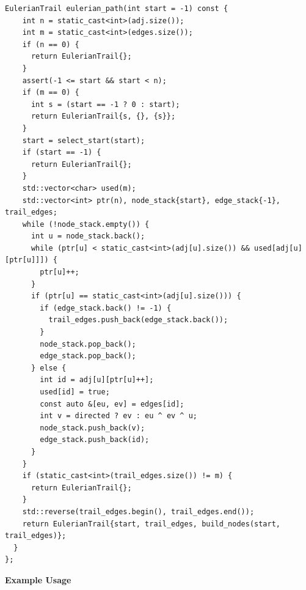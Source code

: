 \begin{lstlisting}[style=cpp]
  EulerianTrail eulerian_path(int start = -1) const {
    int n = static_cast<int>(adj.size());
    int m = static_cast<int>(edges.size());
    if (n == 0) {
      return EulerianTrail{};
    }
    assert(-1 <= start && start < n);
    if (m == 0) {
      int s = (start == -1 ? 0 : start);
      return EulerianTrail{s, {}, {s}};
    }
    start = select_start(start);
    if (start == -1) {
      return EulerianTrail{};
    }
    std::vector<char> used(m);
    std::vector<int> ptr(n), node_stack{start}, edge_stack{-1}, trail_edges;
    while (!node_stack.empty()) {
      int u = node_stack.back();
      while (ptr[u] < static_cast<int>(adj[u].size()) && used[adj[u][ptr[u]]]) {
        ptr[u]++;
      }
      if (ptr[u] == static_cast<int>(adj[u].size())) {
        if (edge_stack.back() != -1) {
          trail_edges.push_back(edge_stack.back());
        }
        node_stack.pop_back();
        edge_stack.pop_back();
      } else {
        int id = adj[u][ptr[u]++];
        used[id] = true;
        const auto &[eu, ev] = edges[id];
        int v = directed ? ev : eu ^ ev ^ u;
        node_stack.push_back(v);
        edge_stack.push_back(id);
      }
    }
    if (static_cast<int>(trail_edges.size()) != m) {
      return EulerianTrail{};
    }
    std::reverse(trail_edges.begin(), trail_edges.end());
    return EulerianTrail{start, trail_edges, build_nodes(start, trail_edges)};
  }
};
\end{lstlisting}
\textbf{Example Usage}\par
